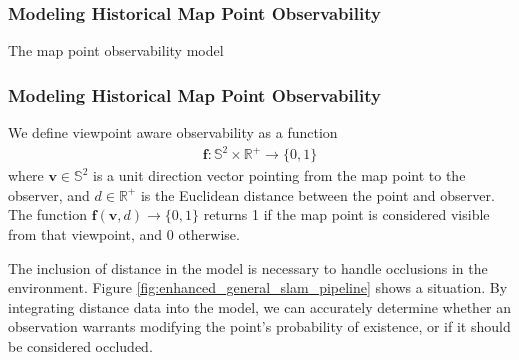 \subsubsection{Modeling Historical Map Point Observability}

The map point observability model

\subsubsection{Modeling Historical Map Point Observability}
\label{sec:observability_models}

We define viewpoint aware observability as a function
\begin{align*}
    \boldsymbol{f:}\mathbb{S}^2\times\mathbb{R}^+\rightarrow\{0,1\}
\end{align*}
where $\mathbf{v}\in\mathbb{S}^2$ is a unit direction vector pointing from the map point to the observer, and $d\in\mathbb{R}^+$ is the Euclidean distance between the point and observer. The function $\boldsymbol{f}(\mathbf{v}, d)\rightarrow\{0,1\}$ returns 1 if the map point is considered visible from that viewpoint, and 0 otherwise.


The inclusion of distance in the model is necessary to handle occlusions in the environment. Figure \ref{fig:enhanced_general_slam_pipeline} shows a situation. By integrating distance data into the model, we can accurately determine whether an observation warrants modifying the point's probability of existence, or if it should be considered occluded.


